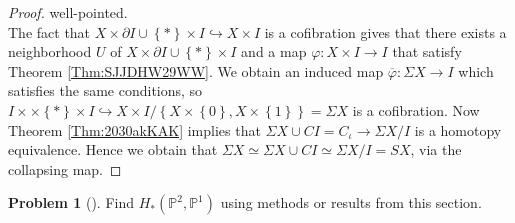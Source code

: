 \documentclass[reqno]{amsart}
\theoremstyle{definition}
\newtheorem{problem}[theorem]{Problem}
\theoremstyle{remark}
\begin{document}
\begin{proof}
well-pointed.\\
\linebreak
The fact that
$X \times \partial I \cup \left\{ * \right\} \times I
\hookrightarrow X \times I$ is a cofibration
gives that there exists a neighborhood $U$ of
$X \times \partial I \cup 
\left\{ * \right\} \times I$ and a map
$\varphi \colon X \times I \to I$ 
that satisfy Theorem \ref{Thm:SJJDHW29WW}.
We obtain an induced map
$\overline{\varphi }\colon
\Sigma X \to I$ 
which satisfies the same conditions, so
$I \times \times \left\{ * \right\} \times I
\hookrightarrow X \times I / 
\left\{ X \times \left\{ 0 \right\} ,
X \times \left\{ 1 \right\} \right\} = \Sigma X$ is a
cofibration. Now 
Theorem \ref{Thm:2030akKAK} implies
that $\Sigma X \cup CI = C_{\iota} \to \Sigma X / I$ is a homotopy
equivalence.
Hence we obtain
that 
$\Sigma X \simeq
\Sigma X \cup CI \simeq
\Sigma X / I = SX$, via the collapsing map.

\end{proof}


\begin{problem}[]
    Find $H_* \left( \mathbb{P}^2, \mathbb{P}^{1} \right) $ 
    using methods or results from this section.
\end{problem}
\end{document}
